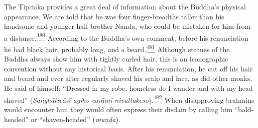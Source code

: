 The Tipitaka provides a great deal of information about the Buddha's
physical appearance. We are told that he was four finger-breadths taller
than his handsome and younger half-brother Nanda, who could be mistaken
for him from a
distance.\label{footprints_split_013.html_fnref480}\hyperref[footprints_split_025.htmlux5cux23fn480]{\textsuperscript{480}}
According to the Buddha's own comment, before his renunciation he had
black hair, probably long, and a
beard.\label{footprints_split_013.html_fnref481}\hyperref[footprints_split_025.htmlux5cux23fn481]{\textsuperscript{481}}
Although statues of the Buddha always show him with tightly curled hair,
this is an iconographic convention without any historical basis. After
his renunciation, he cut off his hair and beard and ever after regularly
shaved his scalp and face, as did other monks. He said of himself:
``Dressed in my robe, homeless do I wander and with my head shaved''
(\emph{Saṅghātivāsī agiho carāmi
nivuttakeso}).\label{footprints_split_013.html_fnref482}\hyperref[footprints_split_025.htmlux5cux23fn482]{\textsuperscript{482}}
When disapproving brahmins would encounter him they would often express
their disdain by calling him ``bald-headed'' or ``shaven-headed''
(\emph{muṇḍa}).

